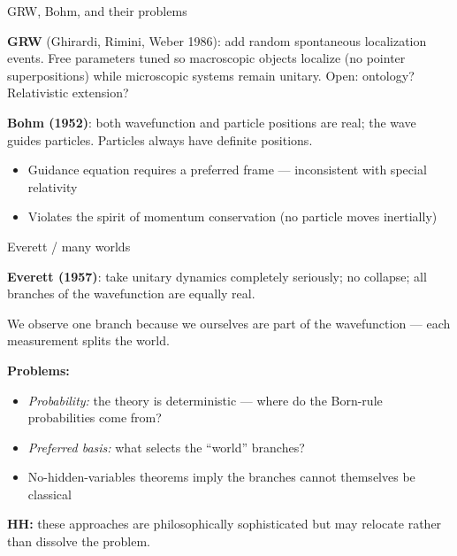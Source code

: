 \documentclass[fleql]{beamer}
\begin{document}
\begin{frame}{GRW, Bohm, and their problems}

  \textbf{GRW} (Ghirardi, Rimini, Weber 1986): add random
  spontaneous localization events. Free parameters tuned so
  macroscopic objects localize (no pointer superpositions) while
  microscopic systems remain unitary. Open: ontology? Relativistic
  extension?

  \vspace{0.5em}
  \textbf{Bohm (1952)}: both wavefunction and particle positions
  are real; the wave guides particles. Particles always have
  definite positions.
  \begin{itemize}\small
  \item Guidance equation requires a preferred frame ---
    inconsistent with special relativity
  \item Violates the spirit of momentum conservation (no particle
    moves inertially)
  \end{itemize}

\end{frame}

\begin{frame}{Everett / many worlds}

  \textbf{Everett (1957)}: take unitary dynamics completely seriously;
  no collapse; all branches of the wavefunction are equally real.

  \vspace{0.5em}
  We observe one branch because we ourselves are part of the
  wavefunction --- each measurement splits the world.

  \vspace{0.5em}
  \textbf{Problems:}
  \begin{itemize}\small
  \item \emph{Probability:} the theory is deterministic --- where do
    the Born-rule probabilities come from?
  \item \emph{Preferred basis:} what selects the ``world'' branches?
  \item No-hidden-variables theorems imply the branches cannot
    themselves be classical
  \end{itemize}

  \vspace{0.4em}
  \small \textbf{HH:} these approaches are philosophically
  sophisticated but may relocate rather than dissolve the problem.

\end{frame}
\end{document}
